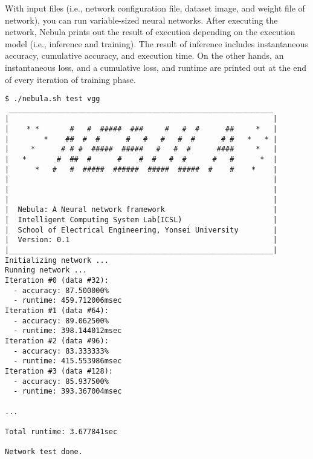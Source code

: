 \documentclass[10pt]{article}
\begin{document}
With input files (i.e., network configuration file, dataset image, and weight file of network), you can run variable-sized neural networks.
After executing the network, Nebula prints out the result of execution depending on the execution model (i.e., inference and training).
The result of inference includes instantaneous accuracy, cumulative accuracy, and execution time.
On the other hands, an instantaneous loss, and a cumulative loss, and runtime are printed out at the end of every iteration of training phase.
\begin{Verbatim}[frame=single,fontsize=\small]
$ ./nebula.sh test vgg
 _____________________________________________________________
|                                                             |
|    * *       #   #  #####  ###     #   #  #      ##     *   |
|        *    ##  #  #      #   #   #   #  #      # #   *   * |
|     *      # # #  #####  #####   #   #  #      ####     *   |
|   *       #  ##  #      #    #  #   #  #      #   #      *  |
|      *   #   #  #####  ######  #####  #####  #    #    *    |
|                                                             |
|                                                             |
|                                                             |
|  Nebula: A Neural network framework                         |
|  Intelligent Computing System Lab(ICSL)                     |
|  School of Electrical Engineering, Yonsei University        |
|  Version: 0.1                                               |
|_____________________________________________________________|
Initializing network ...
Running network ...
Iteration #0 (data #32):
  - accuracy: 87.500000%
  - runtime: 459.712006msec
Iteration #1 (data #64):
  - accuracy: 89.062500%
  - runtime: 398.144012msec
Iteration #2 (data #96):
  - accuracy: 83.333333%
  - runtime: 415.553986msec
Iteration #3 (data #128):
  - accuracy: 85.937500%
  - runtime: 393.367004msec

...

Total runtime: 3.677841sec

Network test done.
\end{Verbatim}

%
\end{document}
